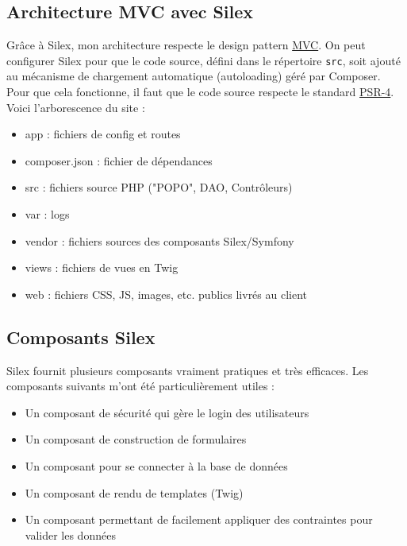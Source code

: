 \documentclass[a4paper, 12pt]{article}
\begin{document}
\newpage

\subsection{Architecture MVC avec Silex}
Grâce à Silex, mon architecture respecte le design pattern \href{https://en.wikipedia.org/wiki/Model-view-controller}{MVC}.
On peut configurer Silex pour que le code source, défini dans le répertoire \texttt{src}, soit ajouté 
au mécanisme de chargement automatique (autoloading) géré par Composer. Pour que cela fonctionne, il faut que le code 
source respecte le standard \href{http://www.php-fig.org/psr/psr-4/}{PSR-4}.
Voici l'arborescence du site :

\begin{itemize}
	\item app : fichiers de config et routes
	\item composer.json : fichier de dépendances
	\item src : fichiers source PHP ("POPO", DAO, Contrôleurs)
	\item var : logs
	\item vendor : fichiers sources des composants Silex/Symfony
	\item views : fichiers de vues en Twig
	\item web : fichiers CSS, JS, images, etc. publics livrés au client
\end{itemize}

\subsection{Composants Silex}
Silex fournit plusieurs composants vraiment pratiques et très efficaces. Les composants suivants m'ont été 
particulièrement utiles :
\begin{itemize}
	\item Un composant de sécurité qui gère le login des utilisateurs
	\item Un composant de construction de formulaires
	\item Un composant pour se connecter à la base de données
	\item Un composant de rendu de templates (Twig)
	\item Un composant permettant de facilement appliquer des contraintes pour valider les données
\end{itemize}
\end{document}
